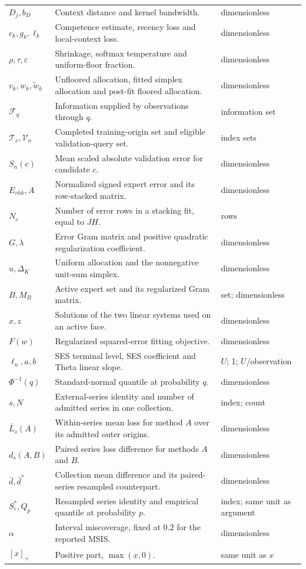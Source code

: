 \begin{longtable}{>{\raggedright\arraybackslash}p{}>{\raggedright\arraybackslash}p{}>{\raggedright\arraybackslash}p{}}
$D_j,b_D$ & Context distance and kernel bandwidth. & dimensionless\\
$c_k,g_k,\ell_k$ & Competence estimate, recency loss and local-context loss. & dimensionless\\
$\rho,\tau,\varepsilon$ & Shrinkage, softmax temperature and uniform-floor fraction. & dimensionless\\
$v_k,w_k,\widetilde w_k$ & Unfloored allocation, fitted simplex allocation and post-fit floored allocation. & dimensionless\\
$\mathcal F_q$ & Information supplied by observations through $q$. & information set\\
$\mathcal T_v,\mathcal V_n$ & Completed training-origin set and eligible validation-query set. & index sets\\
$S_n(c)$ & Mean scaled absolute validation error for candidate $c$. & dimensionless\\
$E_{vhk},A$ & Normalized signed expert error and its row-stacked matrix. & dimensionless\\
$N_e$ & Number of error rows in a stacking fit, equal to $JH$. & rows\\
$G,\lambda$ & Error Gram matrix and positive quadratic regularization coefficient. & dimensionless\\
$u,\Delta_K$ & Uniform allocation and the nonnegative unit-sum simplex. & dimensionless\\
$B,M_B$ & Active expert set and its regularized Gram matrix. & set; dimensionless\\
$x,z$ & Solutions of the two linear systems used on an active face. & dimensionless\\
$F(w)$ & Regularized squared-error fitting objective. & dimensionless\\
$\ell_n,a,b$ & SES terminal level, SES coefficient and Theta linear slope. & $U$; 1; $U$/observation\\
$\Phi^{-1}(q)$ & Standard-normal quantile at probability $q$. & dimensionless\\
$s,N$ & External-series identity and number of admitted series in one collection. & index; count\\
$\bar L_s(A)$ & Within-series mean loss for method $A$ over its admitted outer origins. & dimensionless\\
$d_s(A,B)$ & Paired series loss difference for methods $A$ and $B$. & dimensionless\\
$\bar d,\bar d^*$ & Collection mean difference and its paired-series resampled counterpart. & dimensionless\\
$S_i^*,Q_p$ & Resampled series identity and empirical quantile at probability $p$. & index; same unit as argument\\
$\alpha$ & Interval miscoverage, fixed at $0.2$ for the reported MSIS. & dimensionless\\
$[x]_+$ & Positive part, $\max(x,0)$. & same unit as $x$\\
\bottomrule
\end{longtable}
